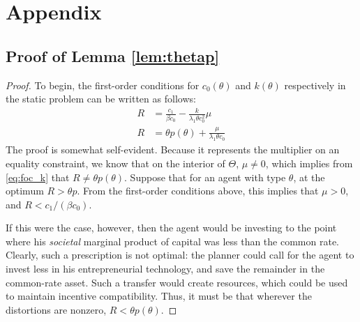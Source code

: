 \documentclass[11pt]{article}
\begin{document}


\newpage
\section*{Appendix}
\setcounter{equation}{0}
\renewcommand{\theequation}{A.\arabic{equation}}

\subsection*{Proof of Lemma \ref{lem:thetap}}
\begin{proof}
    To begin, the first-order conditions for \( c_0(\theta) \) and \( k(\theta) \) respectively in the static problem can be written as follows: 
    \begin{align}
        R&=\frac{c_{1}}{\beta c_{0}}-\frac{k}{\lambda_{1}\theta c_{0}^{2}}\mu \label{eq:foc_c0} \\ 
        R &= \theta p\left(\theta\right)+\frac{\mu}{\lambda_{1}\theta c_{0}} \label{eq:foc_k}
    \end{align}
    The proof is somewhat self-evident. Because it represents the multiplier on an equality constraint, we know that on the interior of \( \Theta \), \( \mu\ne 0 \), which implies from \eqref{eq:foc_k} that \( R \ne \theta p(\theta) \). Suppose that for an agent with type \( \theta \), at the optimum \( R>\theta p \). From the first-order conditions above, this implies that \( \mu>0 \), and \( R<c_1 / (\beta c_0) \).
    
    If this were the case, however, then the agent would be investing to the point where his \textit{societal} marginal product of capital was less than the common rate. Clearly, such a prescription is not optimal: the planner could call for the agent to invest less in his entrepreneurial technology, and save the remainder in the common-rate asset. Such a transfer would create resources, which could be used to maintain incentive compatibility. Thus, it must be that wherever the distortions are nonzero, \( R<\theta p(\theta) \). 
\end{proof}
\end{document}
